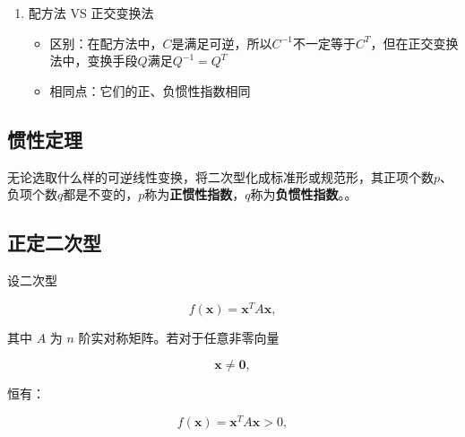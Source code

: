 \documentclass[./linear_algebra.tex]{subfiles}
\begin{document}
\begin{enumerate}
\begin{itemize}
            \item 矩阵语言：任何实对称矩阵$A$，一定存在正交矩阵$A$，使得$Q^{-1}AQ = Q^{T}AQ = \Lambda$，其中
            \[
                \Lambda = \begin{bmatrix}
                              \lambda_1 & & &\\
                              & \lambda_2 & &\\
                              & & \ddots &\\
                              & & & \lambda_n
                \end{bmatrix}
            \]
        \end{itemize}
        \item 配方法 VS 正交变换法
        \begin{itemize}
            \item 区别：在配方法中，$C$是满足可逆，所以$C^{-1}$不一定等于$C^T$，但在正交变换法中，变换手段$Q$满足$Q^{-1} = Q^T$
            \item 相同点：它们的正、负惯性指数相同
        \end{itemize}
    \end{enumerate}

    \subsection{惯性定理}

    无论选取什么样的可逆线性变换，将二次型化成标准形或规范形，其正项个数$p$、负项个数$q$都是不变的，$p$称为\textbf{正惯性指数}，$q$称为\textbf{负惯性指数}。{\color{customgreen}{若二次型的秩为$r$，则$r = p + q$，可逆线性变换不改变正、负惯性指数}}。{\color{red}{合同变换下的不变量：正负惯性指数}}

    \subsection{正定二次型}

    设二次型

    \[
        f(\boldsymbol{x}) = \boldsymbol{x}^{T}A\boldsymbol{x},
    \]

    \noindent
    其中 $A$ 为 $n$ 阶实对称矩阵。若对于任意非零向量

    \[
        \boldsymbol{x}\neq \boldsymbol{0},
    \]

    \noindent
    恒有：

    \[
        f(\boldsymbol{x}) = \boldsymbol{x}^{T}A\boldsymbol{x}>0,
    \]
\end{document}
